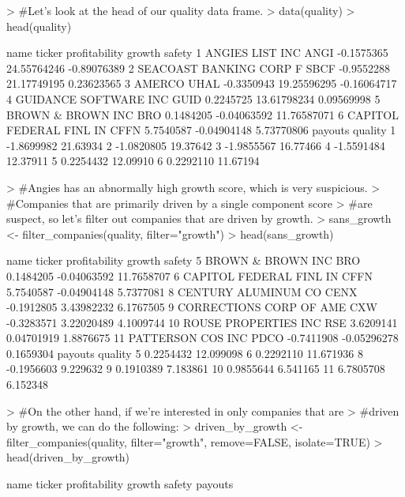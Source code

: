 \documentclass[titlepage]{article}
\begin{document}
\begin{Schunk}
\begin{Sinput}
> #Let's look at the head of our quality data frame.
> data(quality)
> head(quality)
\end{Sinput}
\begin{Soutput}
                     name ticker profitability      growth      safety
1         ANGIES LIST INC   ANGI    -0.1575365 24.55764246 -0.89076389
2 SEACOAST BANKING CORP F   SBCF    -0.9552288 21.17749195  0.23623565
3                  AMERCO   UHAL    -0.3350943 19.25596295 -0.16064717
4   GUIDANCE SOFTWARE INC   GUID     0.2245725 13.61798234  0.09569998
5       BROWN & BROWN INC    BRO     0.1484205 -0.04063592 11.76587071
6 CAPITOL FEDERAL FINL IN   CFFN     5.7540587 -0.04904148  5.73770806
     payouts  quality
1 -1.8699982 21.63934
2 -1.0820805 19.37642
3 -1.9855567 16.77466
4 -1.5591484 12.37911
5  0.2254432 12.09910
6  0.2292110 11.67194
\end{Soutput}
\begin{Sinput}
> #Angies has an abnormally high growth score, which is very suspicious.
> #Companies that are primarily driven by a single component score 
> #are suspect, so let's filter out companies that are driven by growth.
> sans_growth <- filter_companies(quality, filter="growth")
> head(sans_growth)
\end{Sinput}
\begin{Soutput}
                      name ticker profitability      growth     safety
5        BROWN & BROWN INC    BRO     0.1484205 -0.04063592 11.7658707
6  CAPITOL FEDERAL FINL IN   CFFN     5.7540587 -0.04904148  5.7377081
8      CENTURY ALUMINUM CO   CENX    -0.1912805  3.43982232  6.1767505
9  CORRECTIONS CORP OF AME    CXW    -0.3283571  3.22020489  4.1009744
10    ROUSE PROPERTIES INC    RSE     3.6209141  0.04701919  1.8876675
11       PATTERSON COS INC   PDCO    -0.7411908 -0.05296278  0.1659304
      payouts   quality
5   0.2254432 12.099098
6   0.2292110 11.671936
8  -0.1956603  9.229632
9   0.1910389  7.183861
10  0.9855644  6.541165
11  6.7805708  6.152348
\end{Soutput}
\begin{Sinput}
> #On the other hand, if we're interested in only companies that are 
> #driven by growth, we can do the following:
> driven_by_growth <- filter_companies(quality, filter="growth", remove=FALSE, isolate=TRUE)
> head(driven_by_growth)
\end{Sinput}
\begin{Soutput}
                      name ticker profitability   growth      safety    payouts

\end{Soutput}
\end{Schunk}
\end{document}
